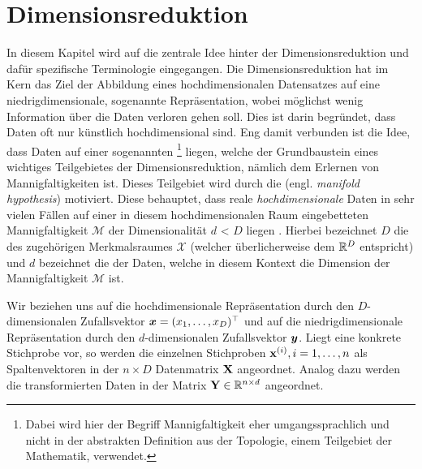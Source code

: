 \chapter{Dimensionsreduktion}
\label{ch:Dimensionsreduktion}

In diesem Kapitel wird auf die zentrale Idee hinter der Dimensionsreduktion und dafür spezifische
Terminologie eingegangen. Die Dimensionsreduktion hat im Kern das Ziel der Abbildung eines
hochdimensionalen Datensatzes auf eine niedrigdimensionale, sogenannte 
Repräsentation, wobei möglichst wenig Information über die Daten verloren gehen soll. Dies ist
darin begründet, dass Daten oft nur künstlich hochdimensional sind. Eng damit verbunden ist die
Idee, dass Daten auf einer sogenannten \footnote{Dabei wird hier der
	Begriff Mannigfaltigkeit eher umgangssprachlich und nicht in der abstrakten Definition aus der
	Topologie, einem Teilgebiet der Mathematik, verwendet.} liegen, welche der Grundbaustein eines
wichtiges Teilgebietes der Dimensionsreduktion, nämlich dem Erlernen von Mannigfaltigkeiten \parencite{Cayton.2005} ist. Dieses Teilgebiet wird durch die 
(engl. \textit{manifold hypothesis}) motiviert. Diese behauptet, dass reale
\textit{hochdimensionale} Daten in sehr vielen Fällen auf einer in diesem hochdimensionalen Raum
eingebetteten Mannigfaltigkeit $\mathcal{M}$ der Dimensionalität $d$ < $D$ liegen \parencite[vgl.][1]{Cayton.2005}.  Hierbei
bezeichnet $D$ die  des zugehörigen Merkmalsraumes $\mathcal{X}$
(welcher überlicherweise dem $\mathbb{R}^D$ entspricht) und $d$ bezeichnet die  der Daten, welche in diesem Kontext die Dimension der Mannigfaltigkeit $\mathcal{M}$
ist.

Wir beziehen uns auf die hochdimensionale Repräsentation durch den $D$-dimensionalen Zufallsvektor
$\bm{x} = (x_1, \ldots, x_D)^\top$ und auf die niedrigdimensionale Repräsentation
durch den $d$-dimensionalen Zufallsvektor $\bm{y}$. Liegt eine konkrete Stichprobe vor, so
werden die einzelnen Stichproben $\mathbf{x}^{(i)}, i = 1,\ldots,n$ als Spaltenvektoren in der $n
	\times D$ Datenmatrix $\mathbf{X}$ angeordnet. Analog dazu werden die transformierten Daten in der
Matrix $\mathbf{Y} \in \mathbb{R}^{n \times d}$ angeordnet.

